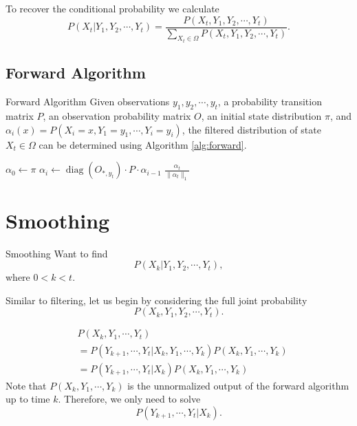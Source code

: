 \documentclass{beamer}
\DeclareMathOperator{\diag}{diag}
\begin{document}
\begin{frame}
To recover the conditional probability we calculate
\begin{equation}
P(X_t | Y_1, Y_{2}, \cdots, Y_t) = \frac{P(X_t, Y_1, Y_{2}, \cdots, Y_t)}{\sum_{X_t \in \Omega}{P(X_t, Y_1, Y_{2}, \cdots, Y_t)}}.
\end{equation}
\end{frame}

\subsection{Forward Algorithm}
\begin{frame}{Forward Algorithm}
Given observations $y_1, y_2, \cdots, y_t$, a probability transition matrix $P$, an observation probability matrix $O$, an initial state distribution $\pi$, and $\alpha_i(x) = P(X_i = x, Y_1 = y_1, \cdots, Y_i = y_i)$, the filtered distribution of state $X_t \in \Omega$ can be determined using Algorithm \ref{alg:forward}.
\begin{algorithm}[H]
\caption{Forward Algorithm}
\label{alg:forward}
\begin{algorithmic}
\STATE $\alpha_0 \leftarrow \pi$
\STATE $\alpha_i \leftarrow \diag(O_{*,y_t}) \cdot P \cdot \alpha_{i-1}$
\ENDFOR
\RETURN $\frac{\alpha_t}{\|\alpha_t\|_1}$
\end{algorithmic}
\end{algorithm}
\end{frame}

\section{Smoothing}
\begin{frame}{Smoothing}
Want to find
\begin{equation}
\label{eqn:smoothing}
P(X_k | Y_1, Y_2, \cdots, Y_t), 
\end{equation}
where $0<k<t$.
\end{frame}

\begin{frame}
Similar to filtering, let us begin by considering the full joint probability 
\begin{equation}
P(X_{k}, Y_{1}, Y_{2}, \cdots, Y_t).
\end{equation}
\end{frame}

\begin{frame}
\begin{align}
&P(X_k, Y_1, \cdots, Y_t) \\
&= P(Y_{k+1}, \cdots, Y_t | X_k, Y_1, \cdots, Y_k) P(X_k,  Y_1, \cdots, Y_k) \\
&= P(Y_{k+1}, \cdots, Y_t | X_k) P(X_k,  Y_1, \cdots, Y_k)
\end{align}
Note that $P(X_k, Y_1, \cdots, Y_k)$ is the unnormalized output of the forward algorithm up to time $k$. Therefore, we only need to solve 
\begin{equation}
P(Y_{k+1}, \cdots, Y_t | X_k).
\end{equation}
\end{frame}
\end{document}
